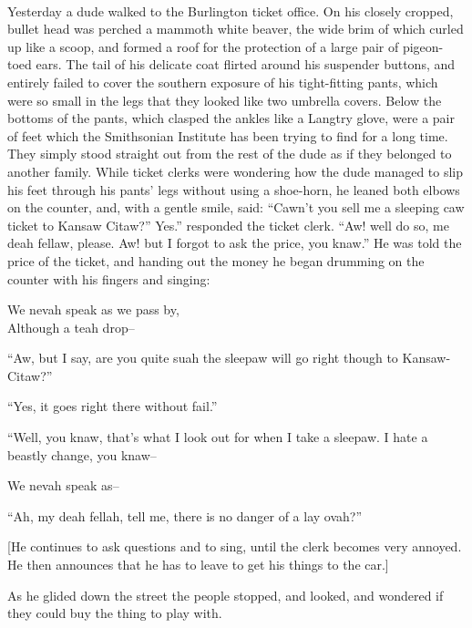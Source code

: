 \begin{ipquote}
\begin{center}
\\
\end{center}
{Yesterday a dude walked to the Burlington ticket office. On his closely cropped, bullet head was perched a mammoth white beaver, the wide brim of which curled up like a scoop, and formed a roof for the protection of a large pair of pigeon-to{\kern0pt}ed ears. The tail of his delicate coat flirted around his suspender buttons, and entirely failed to cover the southern exposure of his tight-fitting pants, which were so small in the legs that they looked like two umbrella covers. Below the bottoms of the pants, which clasped the ankles like a Langtry glove, were a pair of feet which the Smithsonian Institute has been trying to find for a long time. They simply stood straight out from the rest of the dude as if they belonged to another family. While ticket clerks were wondering how the dude managed to slip his feet through his pants’ legs without using a sho{\kern0pt}e-horn, he leaned both elbows on the counter, and, with a gentle smile, said: “Cawn’t you sell me a sleeping caw ticket to Kansaw Citaw?”
Yes.” responded the ticket clerk.
“Aw! well do so, me deah fellaw, please. Aw! but I forgot to ask the price, you knaw.”
He was told the price of the ticket, and handing out the money he began drumming on the counter with his fingers and singing:

\centering 
We nevah speak as we pass by,\\
Although a teah drop–

“Aw, but I say, are you quite suah the sleepaw will go right though to Kansaw-Citaw?”}

{“Yes, it go{\kern0pt}es right there without fail.”

“Well, you knaw, that’s what I look out for when I take a sleepaw. I hate a beastly change, you knaw–

\centering
We nevah speak as–

“Ah, my deah fellah, tell me, there is no danger of a lay ovah?”}


{[He continues to ask questions and to sing, until the clerk becomes very annoyed. He then announces that he has to leave to get his things to the car.]}


As he glided down the street the people stopped, and looked, and wondered if they could buy the thing to play with.
\end{ipquote}


